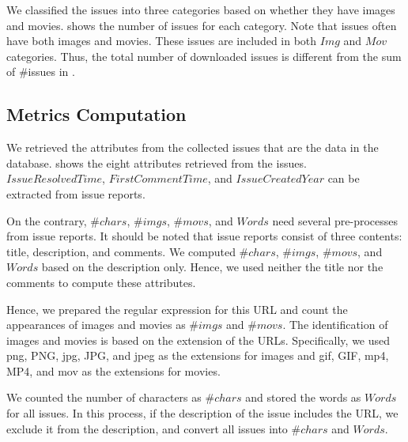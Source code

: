 We classified the issues into three categories based on 
whether they have images and movies. 
 shows the number of issues for each category. 
Note that issues often have both images and movies. 
These issues are included in both $Img$ and $Mov$ categories. 
Thus, the total number of downloaded issues is different from 
the sum of \#issues in . 



% 

\subsection{Metrics Computation}

We retrieved the attributes from the collected issues 
that are the data in the database.  shows the eight attributes 
retrieved from the issues. 
$IssueResolvedTime$, $FirstCommentTime$,
and $IssueCreatedYear$ can be extracted from issue reports. 

On the contrary, $\#chars$, $\#imgs$, $\#movs$, and $Words$ need several pre-processes from issue reports. 
It should be noted that issue reports consist of three contents: 
title, description, and comments. 
We computed $\#chars$, $\#imgs$, $\#movs$, and $Words$ based on the description only. 
Hence, we used neither the title nor the comments 
to compute these attributes.

Hence, we prepared the regular expression for this URL and 
count the appearances of images and movies as $\#imgs$ and $\#movs$. 
The identification of images and movies is based on the extension of 
the URLs. 
Specifically, we used png, PNG, jpg, JPG, and jpeg as 
the extensions for images and 
gif, GIF, mp4, MP4, and mov as the extensions for movies.

We counted the number of characters as $\#chars$ and 
stored the words as $Words$ for all issues. 
In this process, if the description of the issue 
includes the URL, we exclude it from the description, 
and convert all issues into $\#chars$ and $Words$.

